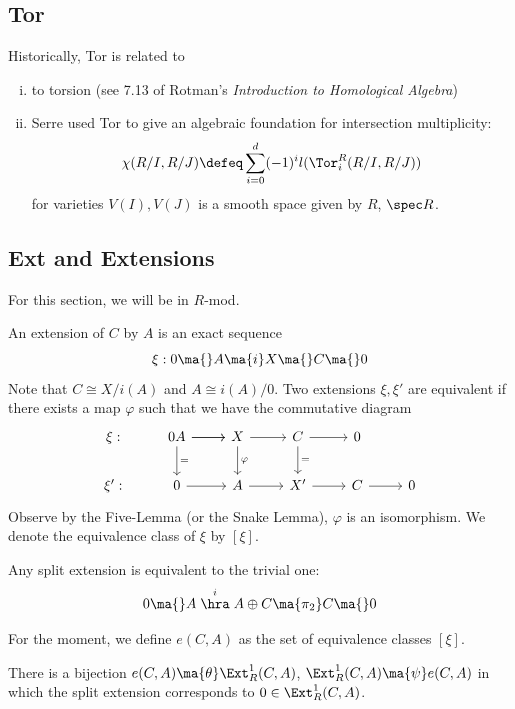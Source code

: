 \subsection{Tor}

Historically, Tor is related to
\begin{enumerate}[(i)]
\item to torsion (see 7.13 of Rotman's \emph{Introduction to Homological Algebra})
\item Serre used Tor to give an algebraic foundation for intersection multiplicity:
\[
\chi(R/I,R/J)\defeq \sum_{i=0}^d (-1)^il(\Tor_i^R(R/I,R/J))
\]
for varieties $V(I),V(J)$ is a smooth space given by $R$, $\spec R$. 
\end{enumerate}

\subsection{Ext and Extensions}

For this section, we will be in $R$-mod. 

\begin{dfn}[Extension]
An extension of $C$ by $A$ is an exact sequence
\[
\xi: 0 \ma{} A \ma{i} X \ma{} C \ma{} 0
\]
Note that $C \cong X/i(A)$ and $A \cong i(A)/0$. Two extensions $\xi,\xi'$ are equivalent if there exists a map $\varphi$ such that we have the commutative diagram
\[
\begin{tikzcd}
\xi: & 0 \arrow{r} A \arrow{d}{=} \arrow{r} & X \arrow{d}{\varphi} \arrow{r} & C \arrow{d}{=} \arrow{r} & 0 \\
\xi': & 0 \arrow{r} & A \arrow{r} & X' \arrow{r} & C \arrow{r} & 0 
\end{tikzcd}
\]
Observe by the Five-Lemma (or the Snake Lemma), $\varphi$ is an isomorphism. We denote the equivalence class of $\xi$ by $[\xi]$. 
\end{dfn}

\begin{rem}
Any split extension is equivalent to the trivial one:
\[
0 \ma{} A \stackrel{i}{\hra} A \oplus C \ma{\pi_2} C \ma{} 0
\]
\end{rem}

\begin{dfn}[$e(C,A)$]
For the moment, we define $e(C,A)$ as the set of equivalence classes $[\xi]$.
\end{dfn}

\begin{thm}
There is a bijection $e(C,A) \ma{\theta} \Ext_R^1(C,A)$, $\Ext_R^1(C,A) \ma{\psi} e(C,A)$ in which the split extension corresponds to $0 \in \Ext_R^1(C,A)$.
\end{thm}

